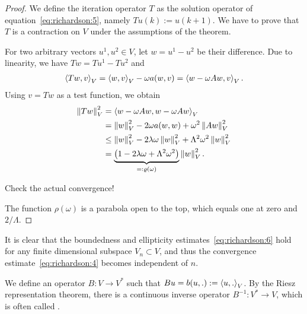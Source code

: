 \begin{proof}
  We define the iteration operator $T$ as the solution operator of
  equation~\eqref{eq:richardson:5}, namely $T u{(k)} := u{(k+1)}$. We
  have to prove that $T$ is a contraction on $V$ under the assumptions
  of the theorem.

  For two arbitrary vectors $u^1, u^2 \in V$, let $w = u^1-u^2$ be
  their difference. Due to linearity, we have $T w = T u^1-T u^2$ and
  \begin{gather*}
    \scal(T w,v)_V = \scal(w,v)_V - \omega a(w,v) = \scal(w-\omega A w,v)_V.
  \end{gather*}
  Using $v=Tw$ as a test function, we obtain
  \begin{align*}
    \norm{Tw}_V^2
    & = \scal(w-\omega A w,w-\omega A w)_V \\
    &= \norm{w}_V^2 - 2\omega a(w,w) + \omega^2 \norm{Aw}_V^2\\
    & \le \norm{w}_V^2 - 2\lambda\omega \norm{w}_V^2
    +  \Lambda^2 \omega^2\norm{w}_V^2\\
    & = \underbrace{\bigl(1-2\lambda\omega
      + \Lambda^2\omega^2\bigr)}_{=:\rho(\omega)} \norm{w}_V^2.
  \end{align*}
  \begin{todo}
    Check the actual convergence!
  \end{todo}
  The function $\rho(\omega)$ is a parabola open to the top, which
  equals one at zero and $2/\Lambda$.
\end{proof}

\begin{note}
  It is clear that the boundedness and ellipticity
  estimates~\eqref{eq:richardson:6} hold for any finite dimensional
  subspace $V_n\subset V$, and thus the convergence
  estimate~\eqref{eq:richardson:4} becomes independent of $n$.
\end{note}  

\begin{note}
  We define an operator $B:V\to V^*$ such that $Bu = b(u,.) :=
  \scal(u,.)_V$. By the Riesz representation theorem, there is a
  continuous inverse operator $B^{-1}: V^*\to V$, which is often
  called .
\end{note}

